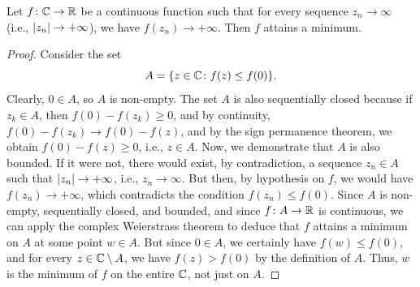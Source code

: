 \begin{theorem}
Let $f\colon {\mathbb C} \to {\mathbb R}$ be a continuous function such that for every sequence
$z_n \to \infty$ (i.e., ${\left|z_n\right|}\to +\infty$), we have $f(z_n) \to +\infty$.
Then $f$ attains a minimum.
\end{theorem}
%
\begin{proof}
Consider the set
\[
  A = {\left\{ z \in {\mathbb C} \colon f(z) \le f(0) \right\}}.
\]
Clearly, $0\in A$, so $A$ is non-empty.
The set $A$ is also sequentially closed because if $z_k\in A$, then $f(0) -
f(z_k)\ge 0$, and by continuity, $f(0)-f(z_k)\to f(0)-f(z)$, and by the sign
permanence theorem, we obtain $f(0)-f(z) \ge 0$, i.e., $z \in A$.
Now, we demonstrate that $A$ is also bounded.
If it were not, there would exist, by contradiction, a sequence $z_n \in A$ such
that ${\left|z_n\right|}\to +\infty$, i.e., $z_n \to \infty$.
But then, by hypothesis on $f$, we would have $f(z_n)\to +\infty$, which
contradicts the condition $f(z_n) \le f(0)$.
Since $A$ is non-empty, sequentially closed, and bounded, and since $f\colon A
\to {\mathbb R}$ is continuous, we can apply the complex Weierstrass theorem to deduce
that $f$ attains a minimum on $A$ at some point $w \in A$.
But since $0\in A$, we certainly have $f(w)\le f(0)$, and for every $z\in {\mathbb C}
\setminus A$, we have $f(z) > f(0)$ by the definition of $A$.
Thus, $w$ is the minimum of $f$ on the entire ${\mathbb C}$, not just on $A$.
\end{proof}


